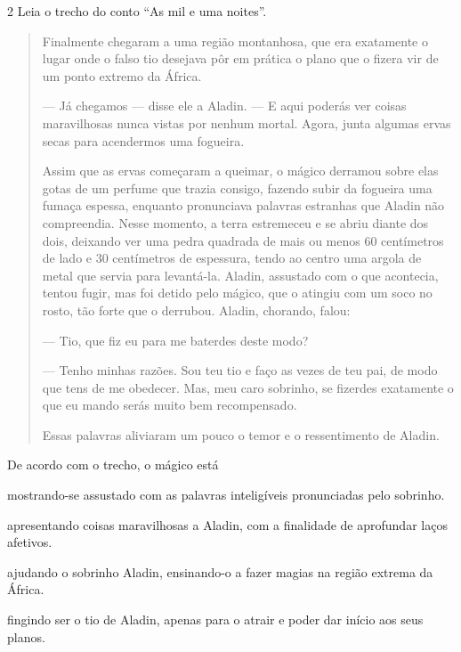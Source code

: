 \num{2} Leia o trecho do conto ``As mil e uma noites''.

\begin{quote}
Finalmente chegaram a uma região montanhosa, que era
exatamente o lugar onde o falso tio desejava pôr em prática o plano que
o fizera vir de um ponto extremo da África.

--- Já chegamos --- disse ele a Aladin. --- E aqui poderás ver coisas
maravilhosas nunca vistas por nenhum mortal. Agora, junta algumas ervas
secas para acendermos uma fogueira.

Assim que as ervas começaram a queimar, o mágico derramou sobre elas
gotas de um perfume que trazia consigo, fazendo subir da fogueira uma
fumaça espessa, enquanto pronunciava palavras estranhas que Aladin não
compreendia. Nesse momento, a terra estremeceu e se abriu diante dos
dois, deixando ver uma pedra quadrada de mais ou menos 60 centímetros de
lado e 30 centímetros de espessura, tendo ao centro uma argola de metal
que servia para levantá-la. Aladin, assustado com o que acontecia,
tentou fugir, mas foi detido pelo mágico, que o atingiu com um soco no
rosto, tão forte que o derrubou. Aladin, chorando, falou:

--- Tio, que fiz eu para me baterdes deste modo?

--- Tenho minhas razões. Sou teu tio e faço as vezes de teu pai, de modo
que tens de me obedecer. Mas, meu caro sobrinho, se fizerdes exatamente
o que eu mando serás muito bem recompensado.

Essas palavras aliviaram um pouco o temor e o ressentimento de Aladin.

\end{quote}

De acordo com o trecho, o mágico está

\begin{escolha}
\item mostrando-se assustado com as palavras inteligíveis pronunciadas pelo sobrinho.

\item apresentando coisas maravilhosas a Aladin, com a finalidade de aprofundar laços afetivos.

\item ajudando o sobrinho Aladin, ensinando-o a fazer magias na região extrema da África.

\item fingindo ser o tio de Aladin, apenas para o atrair e poder dar início aos seus planos.
\end{escolha}

